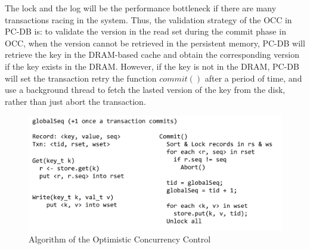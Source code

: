 The lock and the log will be the performance bottleneck if there are many transactions racing in the system. Thus, the validation strategy of the OCC in PC-DB is: 
to validate the version in the read set during the commit phase in OCC, when the version cannot be retrieved in the persistent memory, PC-DB will retrieve  the key in the  DRAM-based cache and obtain the corresponding version if the key exists in the DRAM. 
However, if the key is not in the DRAM, PC-DB will set the transaction retry the function $commit()$ after a period of time, and use a background thread to fetch the lasted version of the key from the disk, rather than just abort the transaction. 
\begin{figure}
    \centering
    \includegraphics[width=0.36\paperwidth]{figure/algorithm.png}
    \caption{Algorithm of the Optimistic Concurrency Control}
    \label{fig:OCCValidation}
\end{figure}